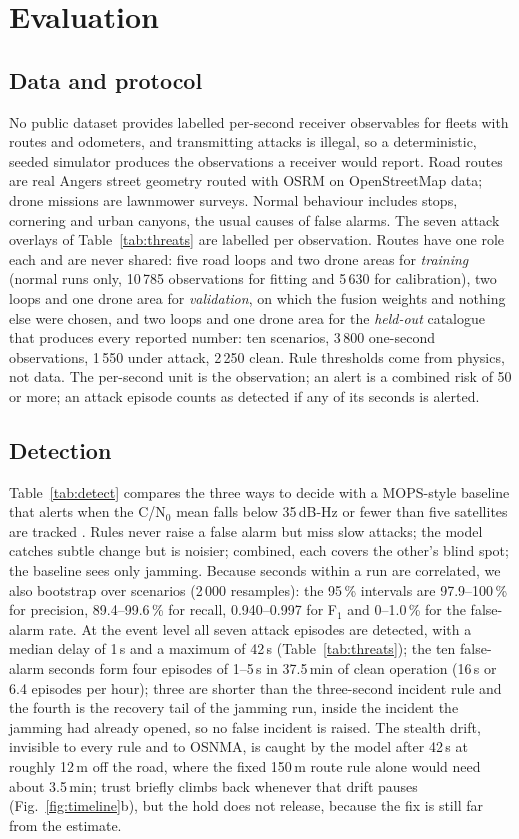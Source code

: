 \documentclass[conference]{IEEEtran}
\begin{document}
\section{Evaluation}\label{sec:eval}

\subsection{Data and protocol}
No public dataset provides labelled per-second receiver observables for fleets with routes and odometers, and transmitting attacks is illegal, so a deterministic, seeded simulator produces the observations a receiver would report. Road routes are real Angers street geometry routed with OSRM on OpenStreetMap data; drone missions are lawnmower surveys. Normal behaviour includes stops, cornering and urban canyons, the usual causes of false alarms. The seven attack overlays of Table~\ref{tab:threats} are labelled per observation. Routes have one role each and are never shared: five road loops and two drone areas for \emph{training} (normal runs only, 10\,785 observations for fitting and 5\,630 for calibration), two loops and one drone area for \emph{validation}, on which the fusion weights and nothing else were chosen, and two loops and one drone area for the \emph{held-out} catalogue that produces every reported number: ten scenarios, 3\,800 one-second observations, 1\,550 under attack, 2\,250 clean. Rule thresholds come from physics, not data. The per-second unit is the observation; an alert is a combined risk of 50 or more; an attack episode counts as detected if any of its seconds is alerted.

\subsection{Detection}
Table~\ref{tab:detect} compares the three ways to decide with a MOPS-style baseline that alerts when the C/N$_0$ mean falls below 35\,dB-Hz or fewer than five satellites are tracked \cite{kriezis2025}. Rules never raise a false alarm but miss slow attacks; the model catches subtle change but is noisier; combined, each covers the other's blind spot; the baseline sees only jamming. Because seconds within a run are correlated, we also bootstrap over scenarios (2\,000 resamples): the 95\,\% intervals are 97.9--100\,\% for precision, 89.4--99.6\,\% for recall, 0.940--0.997 for F$_1$ and 0--1.0\,\% for the false-alarm rate. At the event level all seven attack episodes are detected, with a median delay of 1\,s and a maximum of 42\,s (Table~\ref{tab:threats}); the ten false-alarm seconds form four episodes of 1--5\,s in 37.5\,min of clean operation (16\,s or 6.4 episodes per hour); three are shorter than the three-second incident rule and the fourth is the recovery tail of the jamming run, inside the incident the jamming had already opened, so no false incident is raised. The stealth drift, invisible to every rule and to OSNMA, is caught by the model after 42\,s at roughly 12\,m off the road, where the fixed 150\,m route rule alone would need about 3.5\,min; trust briefly climbs back whenever that drift pauses (Fig.~\ref{fig:timeline}b), but the hold does not release, because the fix is still far from the estimate.
\end{document}
